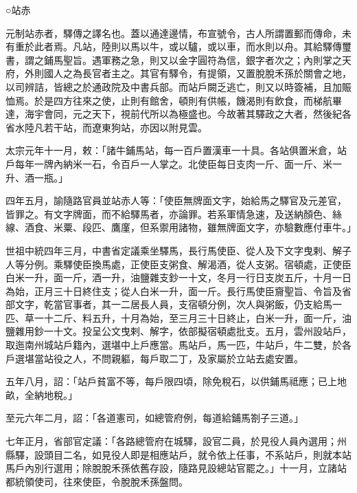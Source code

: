 
\begin{pinyinscope}

 ○站赤



 元制站赤者，驛傳之譯名也。蓋以通達邊情，布宣號令，古人所謂置郵而傳命，未有重於此者焉。凡站，陸則以馬以牛，或以驢，或以車，而水則以舟。其給驛傳璽書，謂之鋪馬聖旨。遇軍務之急，則又以金字圓符為信，銀字者次之；內則掌之天府，外則國人之為長官者主之。其官有驛令，有提領，又置脫脫禾孫於關會之地，以司辨詰，皆總之於通政院及中書兵部。而站戶闕乏逃亡，則又以時簽補，且加賑恤焉。於是四方往來之使，止則有館舍，頓則有供帳，饑渴則有飲食，而梯航畢達，海宇會同，元之天下，視前代所以為極盛也。今故著其驛政之大者，然後紀各省水陸凡若干站，而遼東狗站，亦因以附見雲。



 太宗元年十一月，敕：「諸牛鋪馬站，每一百戶置漢車一十具。各站俱置米倉，站戶每年一牌內納米一石，令百戶一人掌之。北使臣每日支肉一斤、面一斤、米一升、酒一瓶。」



 四年五月，諭隨路官員並站赤人等：「使臣無牌面文字，始給馬之驛官及元差官，皆罪之。有文字牌面，而不給驛馬者，亦論罪。若系軍情急速，及送納顏色、絲線、酒食、米粟、段匹、鷹廑，但系禦用諸物，雖無牌面文字，亦驗數應付車牛。」



 世祖中統四年三月，中書省定議乘坐驛馬，長行馬使臣、從人及下文字曳剌、解子人等分例。乘驛使臣換馬處，正使臣支粥食、解渴酒，從人支粥。宿頓處，正使臣白米一升，面一斤，酒一升，油鹽雜支鈔一十文，冬月一行日支炭五斤，十月一日為始，正月三十日終住支；從人白米一升，面一斤。長行馬使臣齎聖旨、令旨及省部文字，乾當官事者，其一二居長人員，支宿頓分例，次人與粥飯，仍支給馬一匹、草一十二斤、料五升，十月為始，至三月三十日終止，白米一升，面一斤，油鹽雜用鈔一十文。投呈公文曳剌、解字，依部擬宿頓處批支。五月，雲州設站戶，取迤南州城站戶籍內，選堪中上戶應當。馬站戶，馬一匹，牛站戶，牛二雙，於各戶選堪當站役之人，不問親軀，每戶取二丁，及家屬於立站去處安置。



 五年八月，詔：「站戶貧富不等，每戶限四頃，除免稅石，以供鋪馬祗應；已上地畝，全納地稅。」



 至元六年二月，詔：「各道憲司，如總管府例，每道給鋪馬劄子三道。」



 七年正月，省部官定議：「各路總管府在城驛，設官二員，於見役人員內選用；州縣驛，設頭目二名，如見役人即是相應站戶，就令依上任事，不系站戶，則就本站馬戶內別行選用；除脫脫禾孫依舊存設，隨路見設總站官罷之。」十一月，立諸站都統領使司，往來使臣，令脫脫禾孫盤問。




\end{pinyinscope}
